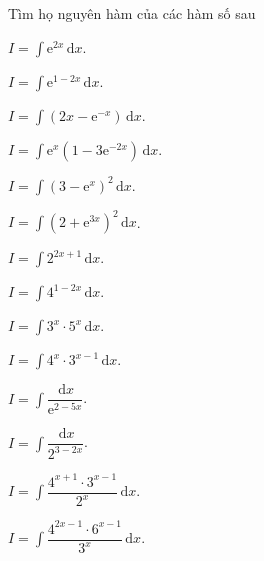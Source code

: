 \begin{vd} %
    Tìm họ nguyên hàm của các hàm số sau
    \begin{listEX}[3]
        \item $I=\displaystyle\int \mathrm{e} ^{2x} \mathrm{\,d}x$.
        \item $I=\displaystyle\int \mathrm{e}^{1-2x} \mathrm{\,d}x$.
        \item $I=\displaystyle\int \left(2x-\mathrm{e}^{-x}\right) \mathrm{\,d}x$.
        \item $I=\displaystyle\int \mathrm{e}^x\left(1-3 \mathrm{e}^{-2x}\right) \mathrm{\,d}x$.
        \item $I=\displaystyle\int \left(3-\mathrm{e}^x\right)^2 \mathrm{\,d}x$.
        \item $I=\displaystyle\int \left(2+\mathrm{e}^{3x}\right)^2 \mathrm{\,d}x$.
        \item $I=\displaystyle\int 2^{2x+1} \mathrm{\,d}x$.
        \item $I=\displaystyle\int 4^{1-2x} \mathrm{\,d}x$.
        \item $I=\displaystyle\int 3^x \cdot 5^x \mathrm{\,d}x$.
        \item $I=\displaystyle\int 4^x \cdot 3^{x-1} \mathrm{\,d}x$.
        \item $I=\displaystyle\int \dfrac{\mathrm{\,d}x}{\mathrm{e}^{2-5x}}$.
        \item $I=\displaystyle\int \dfrac{\mathrm{\,d}x}{2^{3-2x}}$.
        \item $I=\displaystyle\int \dfrac{4^{x+1} \cdot 3^{x-1}}{2^x} \mathrm{\,d}x$.
        \item $I=\displaystyle\int \dfrac{4^{2x-1} \cdot 6^{x-1}}{3^x} \mathrm{\,d}x$.
    \end{listEX}
\end{vd}
